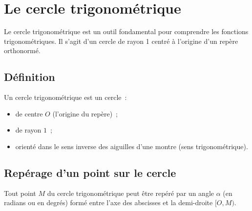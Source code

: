 \documentclass{article}
\begin{document}
\section{Le cercle trigonométrique}

Le cercle trigonométrique est un outil fondamental pour comprendre les fonctions trigonométriques.
Il s'agit d'un cercle de rayon 1 centré à l'origine d'un repère orthonormé.

\subsection{Définition}

Un cercle trigonométrique est un cercle~:
\begin{itemize}
    \item de centre $O$ (l'origine du repère)~;
    \item de rayon $1$~;
    \item orienté dans le sens inverse des aiguilles d'une montre (sens trigonométrique).
\end{itemize}

\subsection{Repérage d'un point sur le cercle}

Tout point $M$ du cercle trigonométrique peut être repéré par un angle $\alpha$ (en radians ou en degrés) formé entre l'axe des abscisses et la demi-droite  $[O, M)$.
\end{document}
